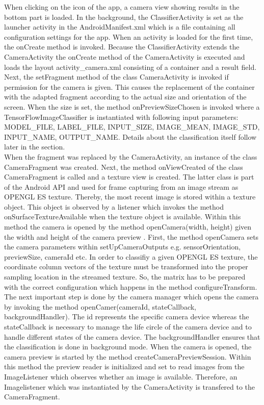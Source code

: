 When clicking on the icon of the app, a camera view showing results in the bottom part is loaded. In the background, the ClassifierActivity is set as the launcher activity in the AndroidManifest.xml which is a file containing all configuration settings for the app. When an activity is loaded for the first time, the onCreate method is invoked. Because the ClassifierActivity extends the CameraActivity the onCreate method of the CameraActivity is executed and loads the layout activity_camera.xml consisting of a container and a result field. Next, the setFragment method of the class CameraActivity is invoked if permission for the camera is given. This causes the replacement of the container with the adapted fragment according to the actual size and orientation of the screen. When the size is set, the method onPreviewSizeChosen is invoked where a TensorFlowImageClassifier is instantiated with following input parameters: MODEL_FILE, LABEL_FILE, INPUT_SIZE, IMAGE_MEAN, IMAGE_STD, INPUT_NAME, OUTPUT_NAME. Details about the classification itself follow later in the section.\\

When the fragment was replaced by the CameraActivity, an instance of the class CameraFragment was created. Next, the method onViewCreated of the class CameraFragment is called and a texture view is created. The latter class is part of the Android API and used for frame capturing from an image stream as OPENGL ES texture. Thereby, the most recent image is stored within a texture object. This object is observed by a listener which invokes the method onSurfaceTextureAvailable when the texture object is available. Within this method the camera is opened by the method openCamera(width, height) given the width and height of the camera preview \citep{AndroidDevelopers}. First, the method openCamera sets the camera parameters within setUpCameraOutputs e.g. sensorOrientation, previewSize, cameraId etc. In order to classifiy a given OPENGL ES texture, the coordinate column vectors of the texture must be transformed into the proper sampling location in the streamed texture. So, the matrix has to be prepared with the correct configuration which happens in the method configureTransform. The next important step is done by the camera manager which opens the camera by invoking the method openCamer(cameraId, stateCallback, backgroundHandler). The id represents the specific camera device whereas the stateCallback is necessary to manage the life circle of the camera device and to handle different states of the camera device. The backgroundHandler ensures that the classification is done in background mode. When the camera is opened, the camera preview is started by the method createCameraPreviewSession. Within this method the preview reader is initialized and set to read images from the ImageListener which observes whether an image is available. Therefore, an Imagelistener which was instantiated by the CameraActivity is transfered to the CameraFragment. \\

